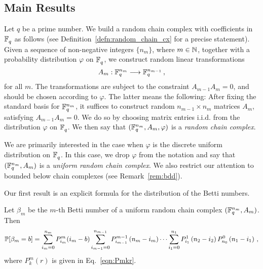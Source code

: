 
\subsection*{Main Results}
Let $q$ be a prime number.  We
build a random chain complex with coefficients in $\mathbb{F}_q^{}$ as follows (see
Definition~\ref{defn:random_chain_cx} for a precise statement). Given a
sequence of non-negative integers $\{n_m\}$, where $m \in \mathbb{N}$, together with a probability
distribution $\varphi$ on $\mathbb{F}_q^{}$, we construct random
linear transformations 
\[
  A_m : \mathbb{F}_q^{n_m} \longrightarrow \mathbb{F}_q^{n_{m-1}} \, ,
\]
for all $m$. The transformations are subject to the constraint $A_{m-1} A_m =
0$, and should be chosen according to $\varphi$. The latter means the
following: After fixing the standard basis for $\mathbb{F}_q^{n_m}$, it suffices to
construct random $n_{m-1} \times n_m$ matrices $A_m$, satisfying $A_{m-1}A_m =
0$. We do so by choosing matrix entries i.i.d. from the distribution $\varphi$
on $\mathbb{F}_q^{}$. We then say that $(\mathbb{F}_q^{n_m}, A_m, \varphi)$ is a {\em random
chain complex}. 

We are primarily interested in the case when $\varphi$ is the discrete uniform
distribution on $\mathbb{F}_q^{}$. In this case, we drop $\varphi$ from the notation and
say that $(\mathbb{F}_q^{n_m}, A_m)$ is a {\em uniform random chain complex}. We also
restrict our attention to bounded below chain complexes (see Remark~\ref{rem:bdd}). 


Our first result is an explicit formula for the distribution
of the Betti numbers.
\begin{bigthm} 
  \label{thm:bettinum}
  Let $\beta_m$ be the $m$-th Betti number of a uniform random chain complex
  $(\mathbb{F}_q^{n_m} , A_m)$. Then
  \[    
    \mathbb{P}[\beta_m = b] = \sum_{i_m=0}^{n_{m}} P_{i_m}^{m}(i_m-b)
    \sum_{i_{m-1}=0}^{n_{m-1}} P_{i_{m-1}}^{m-1}\left(n_{m} -i_m\right) \cdots
    \sum_{i_1 = 0}^{n_1} P_{i_1}^1\left(n_2 - i_2\right) P_{n_0}^0 \left(n_1 - i_1\right) \, ,
  \]
  where $P^m_k(r)$ is given in Eq.~\eqref{eqn:Pmkr}.
\end{bigthm}

